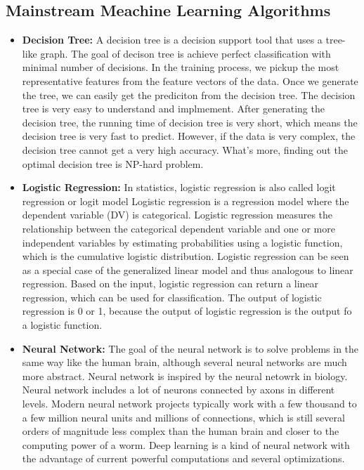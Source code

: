 \subsection{Mainstream Meachine Learning Algorithms}

\begin{itemize}
\item \textbf{Decision Tree:}
A decision tree is a decision support tool that uses a tree-like graph.
The goal of decison tree is achieve perfect classification with minimal number of decisions.
In the training process, we pickup the most representative features from the feature vectors of the data.
Once we generate the tree, we can easily get the prediciton from the decision tree.
The decision tree is very easy to understand and implmement.
After generating the decision tree, the running time of decision tree is very short,
which means the decision tree is very fast to predict.
However, if the data is very complex, the decision tree cannot get a very high accuracy.
What's more, finding out the optimal decision tree is NP-hard problem.

\item \textbf{Logistic Regression:}
In statistics, logistic regression is also called logit regression or logit model
Logistic regression is a regression model where the dependent variable (DV) is categorical.
Logistic regression measures the relationship between the categorical dependent variable and
one or more independent variables by estimating probabilities using a logistic function,
which is the cumulative logistic distribution.
Logistic regression can be seen as a special case of the generalized linear model and thus analogous to linear regression. 
Based on the input, logistic regression can return a linear regression, which can be used for classification.
The output of logistic regression is 0 or 1, because the output of logistic regression is the output fo a logistic function.

\item \textbf{Neural Network:}
The goal of the neural network is to solve problems in the same way like the human brain,
although several neural networks are much more abstract.
Neural network is inspired by the neural netowrk in biology.
Neural network includes a lot of neurons connected by axons in different levels.
Modern neural network projects typically work with a few thousand
to a few million neural units and millions of connections,
which is still several orders of magnitude less complex than the
human brain and closer to the computing power of a worm.
Deep learning is a kind of neural network with the advantage of current powerful computations 
and several optimizations.


\end{itemize}
